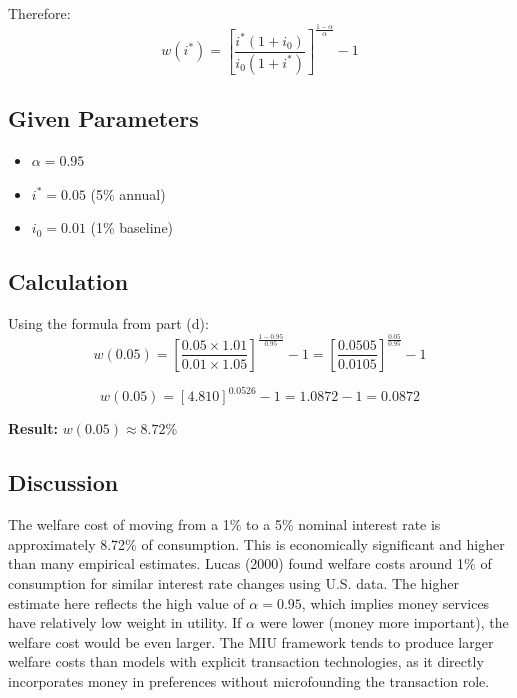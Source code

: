 Therefore:
\begin{equation}
\boxed{w(i^*) = \left[\frac{i^*(1+i_0)}{i_0(1+i^*)}\right]^{\frac{1-\alpha}{\alpha}} - 1}
\end{equation}


\subsection*{Given Parameters}
\begin{itemize}
\item $\alpha = 0.95$
\item $i^* = 0.05$ (5\% annual)
\item $i_0 = 0.01$ (1\% baseline)
\end{itemize}

\subsection*{Calculation}
Using the formula from part (d):
\begin{equation}
w(0.05) = \left[\frac{0.05 \times 1.01}{0.01 \times 1.05}\right]^{\frac{1-0.95}{0.95}} - 1 = \left[\frac{0.0505}{0.0105}\right]^{\frac{0.05}{0.95}} - 1
\end{equation}

\begin{equation}
w(0.05) = [4.810]^{0.0526} - 1 = 1.0872 - 1 = 0.0872
\end{equation}

\textbf{Result:} $w(0.05) \approx 8.72\%$

\subsection*{Discussion}
The welfare cost of moving from a 1\% to a 5\% nominal interest rate is approximately 8.72\% of consumption. This is economically significant and higher than many empirical estimates. Lucas (2000) found welfare costs around 1\% of consumption for similar interest rate changes using U.S. data. The higher estimate here reflects the high value of $\alpha = 0.95$, which implies money services have relatively low weight in utility. If $\alpha$ were lower (money more important), the welfare cost would be even larger. The MIU framework tends to produce larger welfare costs than models with explicit transaction technologies, as it directly incorporates money in preferences without microfounding the transaction role.



